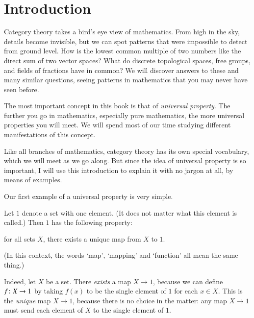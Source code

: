 % 
% 
% 

\chapter*{Introduction}
\label{ch:intro}

Category theory takes a bird's eye view of mathematics.  From high in the sky,
details become invisible, but we can spot patterns that were impossible to
detect from ground level.  How is the lowest common multiple of two numbers
like the direct sum of two vector spaces?  What do discrete topological
spaces, free groups, and fields of fractions have in common?  We will
discover answers to these and many similar questions, seeing patterns in
mathematics that you may never have seen before.

The most important concept in this book is that of \emph{universal%
%
%
property}.  The further you go in mathematics, especially pure mathematics,
the more universal properties you will meet.  We will spend most of our
time studying different manifestations of this concept.

Like all branches of mathematics, category theory has its own special
vocabulary, which we will meet as we go along.  But since the idea of
universal property is so important, I will use this introduction to explain
it with no jargon at all, by means of examples.

Our first example of a universal property is very simple.

\begin{iexample} 
\label{eg:univ-terminal-set}
Let $1$%
%
%
denote a set with one%
%
%
element.  (It does not matter what this element is called.)  Then $1$ has
the following property:
% 
\begin{displaytext}
for all sets $X$, there exists a unique map from $X$ to $1$.
\end{displaytext}
% 
(In this context, the words `map', `mapping' and `function' all mean the
same thing.)

Indeed, let $X$ be a set.  There \emph{exists} a map $X \to 1$, because we
can define $f\from X \to 1$ by taking $f(x)$ to be the single element of
$1$ for each $x \in X$.  This is the \emph{unique} map $X \to 1$, because
there is no choice in the matter: any map $X \to 1$ must send each element
of $X$ to the single element of $1$.
\end{iexample}

